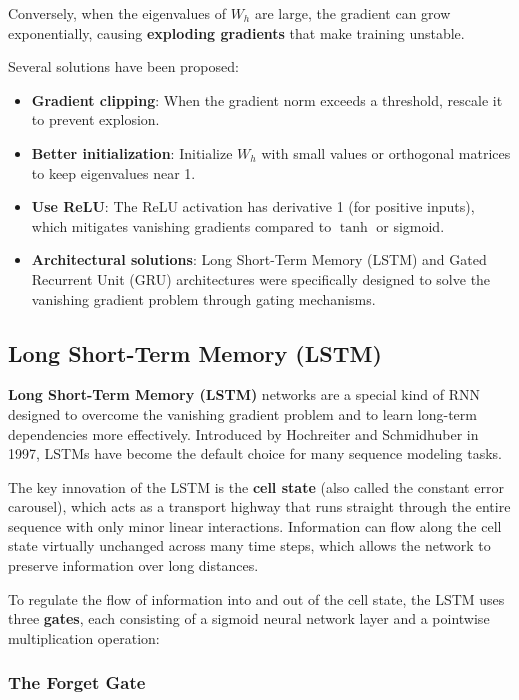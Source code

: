 \documentclass[11pt,a4paper]{article}
\begin{document}
Conversely, when the eigenvalues of $W_h$ are large, the gradient can grow exponentially, causing \textbf{exploding gradients} that make training unstable.

Several solutions have been proposed:
\begin{itemize}
    \item \textbf{Gradient clipping}: When the gradient norm exceeds a threshold, rescale it to prevent explosion.
    \item \textbf{Better initialization}: Initialize $W_h$ with small values or orthogonal matrices to keep eigenvalues near 1.
    \item \textbf{Use ReLU}: The ReLU activation has derivative 1 (for positive inputs), which mitigates vanishing gradients compared to $\tanh$ or sigmoid.
    \item \textbf{Architectural solutions}: Long Short-Term Memory (LSTM) and Gated Recurrent Unit (GRU) architectures were specifically designed to solve the vanishing gradient problem through gating mechanisms.
\end{itemize}

\subsection{Long Short-Term Memory (LSTM)}

\textbf{Long Short-Term Memory (LSTM)} networks are a special kind of RNN designed to overcome the vanishing gradient problem and to learn long-term dependencies more effectively. Introduced by Hochreiter and Schmidhuber in 1997, LSTMs have become the default choice for many sequence modeling tasks.

The key innovation of the LSTM is the \textbf{cell state} (also called the constant error carousel), which acts as a transport highway that runs straight through the entire sequence with only minor linear interactions. Information can flow along the cell state virtually unchanged across many time steps, which allows the network to preserve information over long distances.

To regulate the flow of information into and out of the cell state, the LSTM uses three \textbf{gates}, each consisting of a sigmoid neural network layer and a pointwise multiplication operation:

\subsubsection{The Forget Gate}
\end{document}
